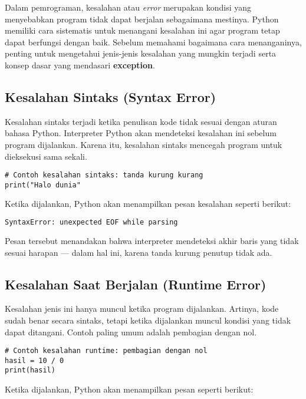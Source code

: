 Dalam pemrograman, kesalahan atau \textit{error} merupakan kondisi yang menyebabkan program tidak dapat berjalan sebagaimana mestinya. Python memiliki cara sistematis untuk menangani kesalahan ini agar program tetap dapat berfungsi dengan baik. Sebelum memahami bagaimana cara menanganinya, penting untuk mengetahui jenis-jenis kesalahan yang mungkin terjadi serta konsep dasar yang mendasari \textbf{exception}.

\subsection*{Kesalahan Sintaks (Syntax Error)}

Kesalahan sintaks terjadi ketika penulisan kode tidak sesuai dengan aturan bahasa Python. Interpreter Python akan mendeteksi kesalahan ini sebelum program dijalankan. Karena itu, kesalahan sintaks mencegah program untuk dieksekusi sama sekali.

\begin{lstlisting}[style=PythonStyle, caption={Contoh kesalahan sintaks}]
# Contoh kesalahan sintaks: tanda kurung kurang
print("Halo dunia"
\end{lstlisting}

Ketika dijalankan, Python akan menampilkan pesan kesalahan seperti berikut:

\begin{lstlisting}[language=bash]
SyntaxError: unexpected EOF while parsing
\end{lstlisting}

Pesan tersebut menandakan bahwa interpreter mendeteksi akhir baris yang tidak sesuai harapan — dalam hal ini, karena tanda kurung penutup tidak ada.

\subsection*{Kesalahan Saat Berjalan (Runtime Error)}

Kesalahan jenis ini hanya muncul ketika program dijalankan. Artinya, kode sudah benar secara sintaks, tetapi ketika dijalankan muncul kondisi yang tidak dapat ditangani. Contoh paling umum adalah pembagian dengan nol.

\begin{lstlisting}[style=PythonStyle, caption={Contoh kesalahan runtime}]
# Contoh kesalahan runtime: pembagian dengan nol
hasil = 10 / 0
print(hasil)
\end{lstlisting}

Ketika dijalankan, Python akan menampilkan pesan seperti berikut:

